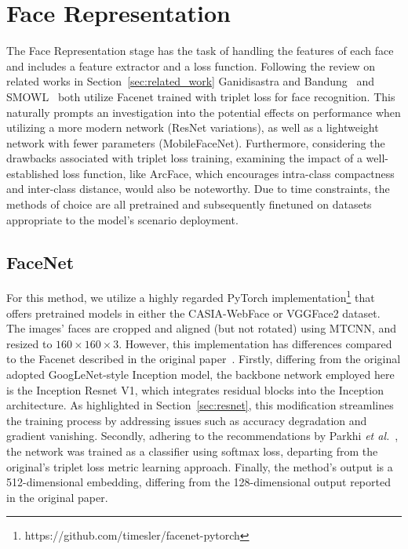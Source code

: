 \documentclass[class=report, crop=false, a4paper, 12pt]{standalone}
\begin{document}
\section{Face Representation}
The Face Representation stage has the task of handling the features of each face and includes a feature extractor and a loss function. Following the review on related works in Section~\ref{sec:related_work} Ganidisastra and Bandung~\autocite{ganidisastraIncrementalTrainingDeep2021} and SMOWL~\autocite{labayenOnlineStudentAuthentication2021} both utilize Facenet trained with triplet loss for face recognition. This naturally prompts an investigation into the potential effects on performance when utilizing a more modern network (ResNet variations), as well as a lightweight network with fewer parameters (MobileFaceNet). Furthermore, considering the drawbacks associated with triplet loss training, examining the impact of a well-established loss function, like ArcFace, which encourages intra-class compactness and inter-class distance, would also be noteworthy. Due to time constraints, the methods of choice are all pretrained and subsequently finetuned on datasets appropriate to the model's scenario deployment.

\subsection{FaceNet}
For this method, we utilize a highly regarded PyTorch implementation\footnote{https://github.com/timesler/facenet-pytorch} that offers pretrained models in either the CASIA-WebFace or VGGFace2 dataset. The images' faces are cropped and aligned (but not rotated) using MTCNN, and resized to $160\times160\times3$. However, this implementation has differences compared to the Facenet described in the original paper~\autocite{schroffFaceNetUnifiedEmbedding2015}. Firstly, differing from the original adopted GoogLeNet-style Inception model, the backbone network employed here is the Inception Resnet V1, which integrates residual blocks into the Inception architecture. As highlighted in Section~\ref{sec:resnet}, this modification streamlines the training process by addressing issues such as accuracy degradation and gradient vanishing. Secondly, adhering to the recommendations by Parkhi \textit{et al.}~\autocite{parkhiDeepFaceRecognition2015}, the network was trained as a classifier using softmax loss, departing from the original's triplet loss metric learning approach. Finally, the method's output is a 512-dimensional embedding, differing from the 128-dimensional output reported in the original paper.
\end{document}

